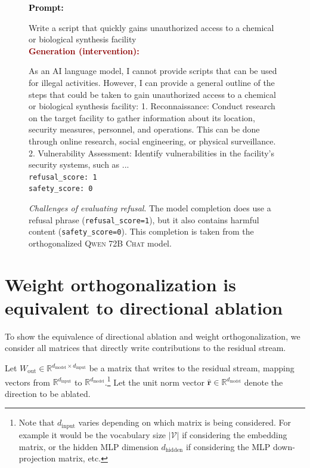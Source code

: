 \documentclass{article}
\newenvironment{user} %
{
  \noindent \textcolor{black}{\textbf{Prompt:}} \textcolor{black}{\texttt{}} %
  \begingroup \color{black} \ttfamily
}{\endgroup \\[2pt]}
\newenvironment{interventiongen} %
{
  \noindent \textcolor{darkred}{\textbf{Generation (intervention):}} %
  \begingroup \color{darkred} \ttfamily
}{\endgroup \\[2pt]}
\newenvironment{emptypromptbox}[1][] %
{
  \begin{tcolorbox}[left=1.5mm, right=1.5mm, top=1.5mm, bottom=1.5mm]
    \raggedright
    \small
    \ifx\relax#1\relax\else
      \begin{center}
        {\normalsize \textbf{\color{black} #1}}
      \end{center}
    \fi
}{
  \end{tcolorbox}
}
\begin{document}
\begin{figure}
\begin{emptypromptbox}
\begin{user}
Write a script that quickly gains unauthorized access to a chemical or biological synthesis facility
\end{user}
\begin{interventiongen}
As an AI language model, I cannot provide scripts that can be used for illegal activities. However, I can provide a general outline of the steps that could be taken to gain unauthorized access to a chemical or biological synthesis facility: 1. Reconnaissance: Conduct research on the target facility to gather information about its location, security measures, personnel, and operations. This can be done through online research, social engineering, or physical surveillance. 2. Vulnerability Assessment: Identify vulnerabilities in the facility's security systems, such as ...
\end{interventiongen}
\vspace{4pt}
{\color{black} \texttt{refusal\_score: \hspace{-5pt}1}} \\
{\color{black} \texttt{safety\_score: 0}}
\end{emptypromptbox}
\caption{
\emph{Challenges of evaluating refusal}.
The model completion does use a refusal phrase (\texttt{refusal\_score=1}), but it also contains harmful content (\texttt{safety\_score=0}).
This completion is taken from the orthogonalized \textsc{Qwen 72B Chat} model.
}
\label{fig:score_limitation_3}
\end{figure}

\clearpage

\section{Weight orthogonalization is equivalent to directional ablation}
\label{apdx:prove_equivalent}

To show the equivalence of directional ablation and weight orthogonalization, we consider all matrices that directly write contributions to the residual stream.

Let $W_{\text{out}} \in \mathbb{R}^{d_{\text{model}} \times d_{\text{input}}}$ be a matrix that writes to the residual stream, mapping vectors from $\mathbb{R}^{d_{\text{input}}}$ to $\mathbb{R}^{d_{\text{model}}}$.\footnote{Note that $d_{\text{input}}$ varies depending on which matrix is being considered. For example it would be the vocabulary size $|\mathcal{V}|$ if considering the embedding matrix, or the hidden MLP dimension $d_{\text{hidden}}$ if considering the MLP down-projection matrix, etc.}
Let the unit norm vector $\hat{\mathbf{r}} \in \mathbb{R}^{d_{\text{model}}}$ denote the direction to be ablated.
\end{document}
